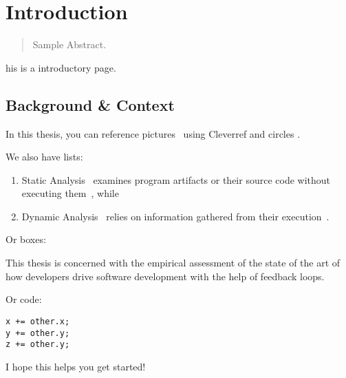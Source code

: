 \chapter{Introduction}
\label{introduction}

\begin{abstract}
Sample Abstract.
\end{abstract}


\newpage

his is a introductory page.

\section{Background \& Context}

In this thesis, you can reference pictures~ using Cleverref and circles
.


We also have lists:

\begin{enumerate}
    \item Static Analysis~ examines program artifacts or their source code without
        executing them~\cite{wichmann1995industrial}, while
    \item Dynamic Analysis~ relies on information gathered from their
        execution~\cite{cornelissen2009systematic}.
\end{enumerate}

Or boxes:

\begin{framed}
This thesis is concerned with the empirical assessment of the state of the art of how developers
drive software development with the help of feedback loops.
\end{framed}

Or code:
\begin{lstlisting}[caption={\textsc{TrinityCore}},label={lst:e1}]
x += other.x;
y += other.y;
z += other.y;
\end{lstlisting}

I hope this helps you get started!
